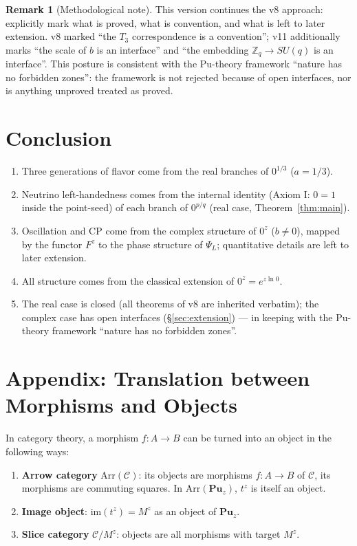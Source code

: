 \documentclass[11pt]{article}
\theoremstyle{plain}
\theoremstyle{definition}
\newtheorem{rem}[thm]{Remark}
\newcommand{\Cat}{\mathbf}
\begin{document}
\begin{rem}[Methodological note]\label{rem:method}
This version continues the v8 approach: explicitly mark what is proved,
what is convention, and what is left to later extension. v8 marked ``the
$T_3$ correspondence is a convention''; v11 additionally marks ``the scale
of $b$ is an interface'' and ``the embedding $\mathbb{Z}_q\to SU(q)$ is an
interface''. This posture is consistent with the Pu-theory framework
``nature has no forbidden zones'': the framework is not rejected because of
open interfaces, nor is anything unproved treated as proved.
\end{rem}

\section{Conclusion}

\begin{enumerate}
\item Three generations of flavor come from the real branches of $0^{1/3}$
($a = 1/3$).
\item Neutrino left-handedness comes from the internal identity
(Axiom I: $0=1$ inside the point-seed) of each branch of $0^{p/q}$
(real case, Theorem~\ref{thm:main}).
\item Oscillation and CP come from the complex structure of $0^z$
($b\neq 0$), mapped by the functor $F^z$ to the phase structure of
$\Psi_L$; quantitative details are left to later extension.
\item All structure comes from the classical extension of
$0^z = e^{z\ln 0}$.
\item The real case is closed (all theorems of v8 are inherited verbatim);
the complex case has open interfaces (\S\ref{sec:extension}) --- in keeping
with the Pu-theory framework ``nature has no forbidden zones''.
\end{enumerate}

\appendix
\section{Appendix: Translation between Morphisms and Objects}

In category theory, a morphism $f: A\to B$ can be turned into an object in
the following ways:
\begin{enumerate}
\item \textbf{Arrow category} $\mathrm{Arr}(\mathcal{C})$: its objects are
morphisms $f: A\to B$ of $\mathcal{C}$, its morphisms are commuting
squares. In $\mathrm{Arr}(\Cat{Pu}_z)$, $t^z$ is itself an object.
\item \textbf{Image object}: $\mathrm{im}(t^z) = M^z$ as an object of
$\Cat{Pu}_z$.
\item \textbf{Slice category} $\mathcal{C}/M^z$: objects are all morphisms
with target $M^z$.
\end{enumerate}
\end{document}
